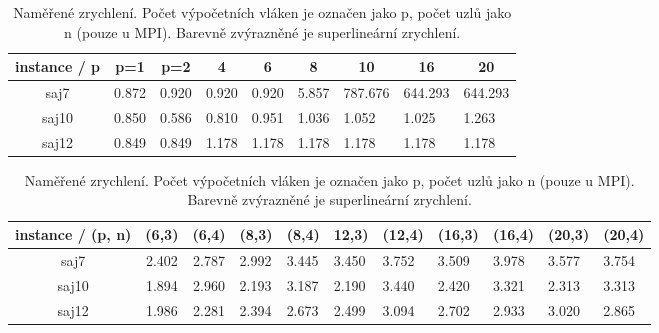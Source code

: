 \documentclass{article}
\begin{document}
\begin{table}[h]
        \begin{subtable}{.5\linewidth}\centering
        \begin{tabular}{|c|c|c|l|l|l|l|l|l|}
            \hline
            \textbf{instance / p} &
            \textbf{p=1} &
            \textbf{p=2} &
            \multicolumn{1}{c|}{\textbf{4}} &
            \multicolumn{1}{c|}{\textbf{6}} &
            \multicolumn{1}{c|}{\textbf{8}} &
            \multicolumn{1}{c|}{\textbf{10}} &
            \multicolumn{1}{c|}{\textbf{16}} &
            \multicolumn{1}{c|}{\textbf{20}} \\ \hline
            saj7  & 0.872 & 0.920 & 0.920 & 0.920 & 5.857 & {\color[HTML]{FE0000} 787.676} & {\color[HTML]{FE0000} 644.293} & {\color[HTML]{FE0000} 644.293} \\ \hline
            saj10 & 0.850 & 0.586 & 0.810 & 0.951 & 1.036 & 1.052                          & 1.025                          & 1.263                          \\ \hline
            saj12 & 0.849 & 0.849 & 1.178 & 1.178 & 1.178 & 1.178                          & 1.178                          & 1.178                          \\ \hline
        \end{tabular}
        \caption{datový paralelismus} \label{tab:speedup-openmp-data}
        \end{subtable}%
        \bigskip
        \bigskip

        \begin{subtable}{.5\linewidth}\centering
        \begin{tabular}{|c|c|c|l|l|l|l|l|l|l|l|}
            \hline
            \textbf{instance / (p, n)} &
            \textbf{(6,3)} &
            \textbf{(6,4)} &
            \multicolumn{1}{c|}{\textbf{(8,3)}} &
            \multicolumn{1}{c|}{\textbf{(8,4)}} &
            \multicolumn{1}{c|}{\textbf{12,3)}} &
            \multicolumn{1}{c|}{\textbf{(12,4)}} &
            \multicolumn{1}{c|}{\textbf{(16,3)}} &
            \multicolumn{1}{c|}{\textbf{(16,4)}} &
            \multicolumn{1}{c|}{\textbf{(20,3)}} &
            \multicolumn{1}{c|}{\textbf{(20,4)}} \\ \hline
            saj7  & 2.402 & 2.787 & 2.992 & 3.445 & 3.450 & 3.752 & 3.509 & 3.978 & 3.577 & 3.754 \\ \hline
            saj10 & 1.894 & 2.960 & 2.193 & 3.187 & 2.190 & 3.440 & 2.420 & 3.321 & 2.313 & 3.313 \\ \hline
            saj12 & 1.986 & 2.281 & 2.394 & 2.673 & 2.499 & 3.094 & 2.702 & 2.933 & 3.020 & 2.865 \\ \hline
        \end{tabular}
        \caption{MPI}\label{tab:speedup-mpi}
        \end{subtable}%

        \caption{Naměřené zrychlení. Počet výpočetních vláken je označen jako p, počet uzlů jako n (pouze u MPI). Barevně zvýrazněné je superlineární zrychlení.}
        \label{tab:speedup}
    \end{table}
\end{document}
